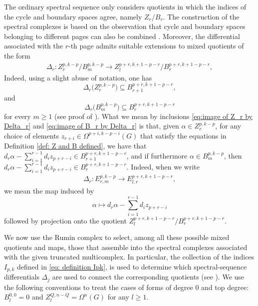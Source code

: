 \documentclass[dvipsnames]{amsart}
\theoremstyle{definition}
\theoremstyle{definition}
\numberwithin{equation}{section}
\begin{document}
The ordinary spectral sequence only considers quotients in which the indices of the cycle and boundary spaces agree, namely $Z_r/B_r$. The construction of the spectral complexes is based on the observation that cycle and boundary spaces belonging to different pages can also be combined \cite[Lemma 4.1]{tripaldi2026spectralcomplexestruncatedmulticomplexes}.
Moreover, the differential associated with the $r$-th page admits suitable extensions to mixed quotients of the form
\begin{align*}\Delta_r\colon Z_r^{p,k-p}/B_m^{p,k-p} \longrightarrow Z_l^{p+r,k+1-p-r}/B_r^{p+r,k+1-p-r}, \end{align*}
Indeed, using a slight abuse of notation, one has
\begin{equation}\label{eq:image of Z_r by Delta_r}
    \Delta_r\bigl(Z_r^{p,k-p}\bigr) \subseteq B_{r+1}^{p+r,k+1-p-r}, 
\end{equation}
and 
\begin{equation}\label{eq:image of B_r by Delta_r}
    \Delta_r\bigl(B_m^{p,k-p}\bigr)  \subseteq B_r^{p+r,k+1-p-r}
\end{equation}
for every $m\geq 1$ (see proof of \cite[Proposition 4.2]{tripaldi2026spectralcomplexestruncatedmulticomplexes}). What we  mean by inclusions \eqref{eq:image of Z_r by Delta_r} and \eqref{eq:image of B_r by Delta_r} is that, given $\alpha\in Z_r^{p,k-p}$, for any choice of elements $z_{r+i}\in\Omega^{p+i,k-p-i}(G)$ that satisfy the equations in Definition \ref{def: Z and B defined}, we have that $d_r\alpha-\sum_{i=1}^{r-1}d_{i}z_{p+r-i}\in B_{r+1}^{p+r,k+1-p-r}$, and if furthermore $\alpha\in B_m^{p,k-p}$, then $d_r\alpha-\sum_{i=1}^{r-1}d_{i}z_{p+r-i}\in B_{r}^{p+r,k+1-p-r}$. Indeed, when we write
\begin{align}\label{eq: Delta_r on mixed quotients}
\Delta_r\colon E_{r,m}^{p,k-p} \longrightarrow E_{l,r}^{p+r,k+1-p-r}, 
\end{align}
we mean the map induced by 
\begin{equation}\label{eq: def representative-level map del Delta_r}
   \alpha
\longmapsto
d_r\alpha-\sum_{i=1}^{r-1}d_i z_{p+r-i}
\end{equation}
 followed by projection onto the quotient $ Z_l^{p+r,k+1-p-r}/B_r^{p+r,k+1-p-r}$.


We now use the Rumin complex to select, among all these possible mixed quotients and maps, those that assemble into the spectral complexes associated with the given truncated multicomplex. In particular, the collection of the indices $I_{p,k}$ defined in \eqref{eq: definition Ipk}, is used to determine which spectral-sequence differentials $\Delta_j$ are used to connect the corresponding quotients (see \cite[Proposition 3.8]{tripaldi2026spectralcomplexestruncatedmulticomplexes}). We use the following conventions to treat the cases of forms of degree 0 and top degree: $B_l^{0,0}=0$ and $Z_l^{Q,n-Q}=\Omega^n(G)$ for any $l\ge 1$.
\end{document}
